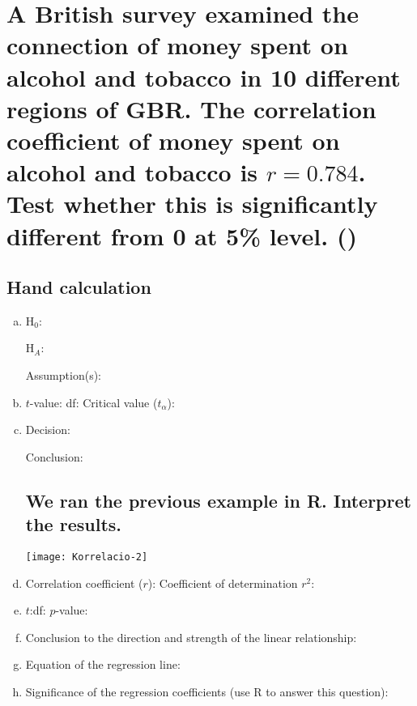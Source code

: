 \section[Connection of money spent on alcohol and tobacco]{A British survey examined the connection of money spent on alcohol and tobacco in 10 different regions of GBR. The correlation coefficient of money spent on alcohol and tobacco is $r = 0.784$. Test whether this is significantly different from 0 at 5\% level. ()}

\subsection*{Hand calculation}
\begin{enumerate}[a)]
\item H$_0$: \hrulefill		


 H$_A$: \hrulefill		
 
 Assumption(s): \hrulefill
\item $t$-value: \hrulefill\quad df:	\hrulefill	 \quad Critical value ($t_\alpha$): 	\hrulefill	
\item Decision: \hrulefill

	 Conclusion: \hrulefill

\subsection*{We ran the previous example in R. Interpret the results.}


\begin{flushright}
	\vspace{-18em}
	\texttt{[image: Korrelacio-2]}\hspace*{3em}
\end{flushright}

\item Correlation coefficient ($r$): \hrulefill\quad 	 Coefficient of determination $r^2$: \hrulefill
\item $t$:\hrulefill\quad df: \hrulefill\quad	 $p$-value:	\hrulefill
\item Conclusion to the direction and strength of the linear relationship: 	\hrulefill
\item Equation of the regression line: \hrulefill


\item Significance of the regression coefficients (use R to answer this question): \hrulefill
\end{enumerate}
\clearpage


